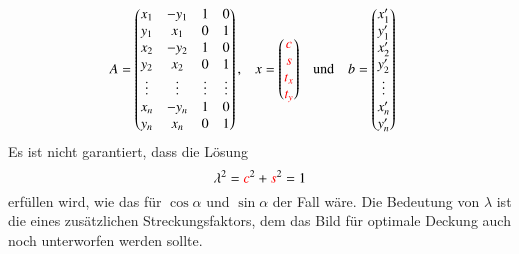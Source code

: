\begin{align*}
A&=
\begin{pmatrix}
x_1&-y_1&1&0\\
y_1& x_1&0&1\\
x_2&-y_2&1&0\\
y_2& x_2&0&1\\
\vdots&\vdots&\vdots&\vdots\\
x_n&-y_n&1&0\\
y_n& x_n&0&1\\
\end{pmatrix},
&
x
&=
\begin{pmatrix}
{\color{red}c}\\
{\color{red}s}\\
{\color{red}t_x}\\
{\color{red}t_y}
\end{pmatrix}
&&\text{und}&
b
&=
\begin{pmatrix}
x_1'\\
y_1'\\
x_2'\\
y_2'\\
\vdots\\
x_n'\\
y_n'\\
\end{pmatrix}
\end{align*}
Es ist nicht garantiert, dass die Lösung
\[
\lambda^2
=
{\color{red}c}^2
+
{\color{red}s}^2
=1
\]
erfüllen wird, wie das für $\cos\alpha$ und $\sin\alpha$ der Fall wäre.
Die Bedeutung von $\lambda$ ist die eines zusätzlichen Streckungsfaktors,
dem das Bild für optimale Deckung auch noch unterworfen werden sollte.



